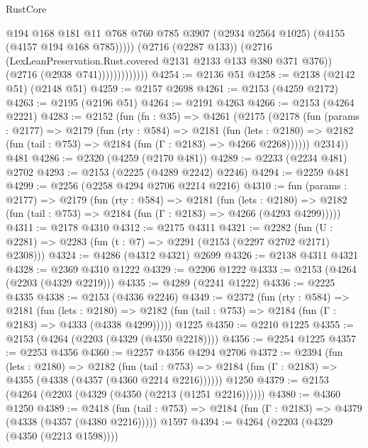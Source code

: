 \begin{lexlean}{RustCore}
\begin{coremodule}
                                @194
                                @168
                                @181
                                @11
                                @768
                                @760
                                @785
                                @3907
                                (@2934 @2564 @1025)
                                (@4155 (@4157 @194 @168 @785)))))
                          (@2716 (@2287 @133))
                          (@2716 (LexLeanPreservation.Rust.covered @2131 @2133 @133 @380 @371 @376))
                          (@2716 (@2938 @741)))))))))))))
@4254 := @2136 @51
@4258 := @2138 (@2142 @51) (@2148 @51)
@4259 := @2157 @2698
@4261 := @2153 (@4259 @2172)
@4263 := @2195 (@2196 @51)
@4264 := @2191 @4263
@4266 := @2153 (@4264 @2221)
@4283 := @2152
    (fun (fn : @35) =>
    @4261
      (@2175
        (@2178
          (fun (params : @2177) =>
          @2179
            (fun (rty : @584) =>
            @2181
              (fun (lets : @2180) =>
              @2182 (fun (tail : @753) => @2184 (fun (Γ : @2183) => @4266 @2268))))))
        @2314))
    @481
@4286 := @2320 (@4259 (@2170 @481))
@4289 := @2233 (@2234 @481) @2702
@4293 := @2153 (@2225 (@4289 @2242) @2246)
@4294 := @2259 @481
@4299 := @2256 (@2258 @4294 @2706 @2214 @2216)
@4310 := fun (params : @2177) =>
  @2179
    (fun (rty : @584) =>
    @2181
      (fun (lets : @2180) =>
      @2182 (fun (tail : @753) => @2184 (fun (Γ : @2183) => @4266 (@4293 @4299)))))
@4311 := @2178 @4310
@4312 := @2175 @4311
@4321 := @2282 (fun (U : @2281) => @2283 (fun (t : @7) => @2291 (@2153 (@2297 @2702 @2171) @2308)))
@4324 := @4286 (@4312 @4321) @2699
@4326 := @2138 @4311 @4321
@4328 := @2369 @4310 @1222
@4329 := @2206 @1222
@4333 := @2153 (@4264 (@2203 (@4329 @2219)))
@4335 := @4289 (@2241 @1222)
@4336 := @2225 @4335
@4338 := @2153 (@4336 @2246)
@4349 := @2372
    (fun (rty : @584) =>
    @2181
      (fun (lets : @2180) =>
      @2182 (fun (tail : @753) => @2184 (fun (Γ : @2183) => @4333 (@4338 @4299)))))
    @1225
@4350 := @2210 @1225
@4355 := @2153 (@4264 (@2203 (@4329 (@4350 @2218))))
@4356 := @2254 @1225
@4357 := @2253 @4356
@4360 := @2257 @4356 @4294 @2706
@4372 := @2394
    (fun (lets : @2180) =>
    @2182
      (fun (tail : @753) => @2184 (fun (Γ : @2183) => @4355 (@4338 (@4357 (@4360 @2214 @2216))))))
    @1250
@4379 := @2153 (@4264 (@2203 (@4329 (@4350 (@2213 (@1251 @2216))))))
@4380 := @4360 @1250
@4389 := @2418
    (fun (tail : @753) => @2184 (fun (Γ : @2183) => @4379 (@4338 (@4357 (@4380 @2216)))))
    @1597
@4394 := @4264 (@2203 (@4329 (@4350 (@2213 @1598))))

\end{coremodule}
\end{lexlean}
